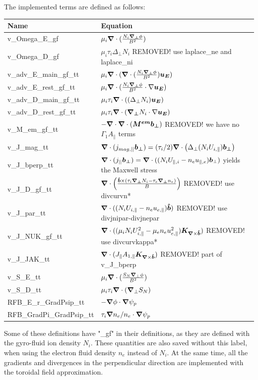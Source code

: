 The implemented terms are defined as follows:
\begin{longtable}{ll}
\toprule
\rowcolor{gray!50}\textbf{Name} &  \textbf{Equation}\\
\midrule
    v\_Omega\_E\_gf &$ \mu_i{\boldsymbol{\nabla}}\cdot(\frac{N_i{\boldsymbol{\nabla_\perp}}\phi}{B^2})$ \\
    v\_Omega\_D\_gf &$ \mu_i\tau_i \Delta_\perp N_i$ REMOVED! use laplace\_ne and laplace\_ni \\
    v\_adv\_E\_main\_gf\_tt &$ \mu_i{\boldsymbol{\nabla}}\cdot({\boldsymbol{\nabla}}\cdot (\frac{N_i{\boldsymbol{\nabla_\perp}}\phi}{B^2}){\boldsymbol{u_E}})   $\\
    v\_adv\_E\_rest\_gf\_tt &$ \mu_i{\boldsymbol{\nabla}}\cdot(\frac{N_i{\boldsymbol{\nabla_\perp}}\phi}{B^2}\cdot\nabla {\boldsymbol{u_E}})  $\\
    v\_adv\_D\_main\_gf\_tt &$  \mu_i\tau_i {\boldsymbol{\nabla}}\cdot((\Delta_\perp N_i){\boldsymbol{u_E}})   $\\
    v\_adv\_D\_rest\_gf\_tt &$  \mu_i\tau_i {\boldsymbol{\nabla}}\cdot({\boldsymbol{\nabla_\perp}} N_i\cdot\nabla {\boldsymbol{u_E}})  $\\
    v\_M\_em\_gf\_tt &$  -{\boldsymbol{\nabla}}\cdot{\boldsymbol{\nabla}}\cdot({\boldsymbol{M^{em}}}{\boldsymbol{b_\perp}})$ REMOVED! we have no $\Gamma_1 A_\parallel$ terms \\
    v\_J\_mag\_tt &$ {\boldsymbol{\nabla}}\cdot(j_{mag,||}{\boldsymbol{b_\perp}})=(\tau_i/2){\boldsymbol{\nabla}}\cdot\left(\Delta_\perp( N_i U_{i,\parallel}){\boldsymbol{b_\perp}}\right)  $\\
    v\_J\_bperp\_tt &$ {\boldsymbol{\nabla}}\cdot(j_{||}{\boldsymbol{b_\perp}}) = {\boldsymbol{\nabla}}\cdot ((N_i U_{\parallel,i} - n_e u_{\parallel,e}){\boldsymbol{b}}_\perp)$ yields the Maxwell stress\\
    v\_J\_D\_gf\_tt &$ {\boldsymbol{\nabla}}\cdot\left(\frac{\bm{\hat{b}}\times(\tau_i{\boldsymbol{\nabla_\perp}} N_i-\tau_e{\boldsymbol{\nabla_\perp}} n_e)}{B}\right) $ REMOVED! use divcurvn*\\
    v\_J\_par\_tt &$ {\boldsymbol{\nabla}}\cdot((N_i U_{i,\parallel} - n_e u_{e,\parallel})\bm{\hat{b}})  $ REMOVED! use divjnipar-divjnepar\\
    v\_J\_NUK\_gf\_tt &$ {\boldsymbol{\nabla}}\cdot((\mu_iN_iU_{i,\parallel}^2-\mu_en_eu_{e,\parallel}^2){{\boldsymbol{K}}_{{\boldsymbol{\nabla}}\times\bm{\hat{b}}}})  $ REMOVED! use divcurvkappa*\\
    v\_J\_JAK\_tt &$ {\boldsymbol{\nabla}}\cdot(J_\parallel A_{1,\parallel}{{\boldsymbol{K}}_{{\boldsymbol{\nabla}}\times\bm{\hat{b}}}})  $ REMOVED! part of v\_J\_bperp\\
    v\_S\_E\_tt &$ \mu_i{\boldsymbol{\nabla}}\cdot(\frac{S_N{\boldsymbol{\nabla}}_{\perp}\phi}{B^2})  $\\
    v\_S\_D\_tt &$ \mu_i\tau_i{\boldsymbol{\nabla}}\cdot({\boldsymbol{\nabla}}_{\perp} S_{N})  $\\
    RFB\_E\_r\_GradPsip\_tt &$ -{\boldsymbol{\nabla}}\phi\cdot{\boldsymbol{\nabla}}\psi_p  $\\
    RFB\_GradPi\_GradPsip\_tt &$ \tau_i{\boldsymbol{\nabla}} n_e/n_e\cdot{\boldsymbol{\nabla}}\psi_p  $\\
\bottomrule
\end{longtable}
Some of these definitions have "\_gf" in their definitions, as they are defined with the gyro-fluid ion density $N_i$. These quantities are also saved without this label, when using the electron fluid density $n_e$ instead of $N_i$. At the same time, all the gradients and divergences in the perpendicular direction are implemented with the toroidal field approximation.


